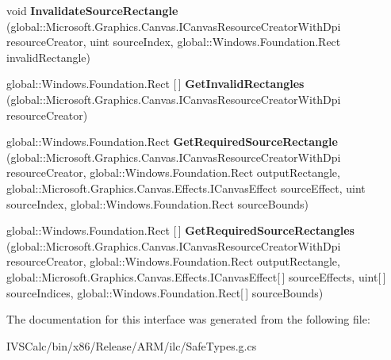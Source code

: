 \begin{DoxyCompactItemize}
void {\bfseries Invalidate\+Source\+Rectangle} (global\+::\+Microsoft.\+Graphics.\+Canvas.\+I\+Canvas\+Resource\+Creator\+With\+Dpi resource\+Creator, uint source\+Index, global\+::\+Windows.\+Foundation.\+Rect invalid\+Rectangle)
\item 
\mbox{\label{interface_microsoft_1_1_graphics_1_1_canvas_1_1_effects_1_1_i_canvas_effect_a0220e194166c3d00d600f6b875b53a99}} 
global\+::\+Windows.\+Foundation.\+Rect \mbox{[}$\,$\mbox{]} {\bfseries Get\+Invalid\+Rectangles} (global\+::\+Microsoft.\+Graphics.\+Canvas.\+I\+Canvas\+Resource\+Creator\+With\+Dpi resource\+Creator)
\item 
\mbox{\label{interface_microsoft_1_1_graphics_1_1_canvas_1_1_effects_1_1_i_canvas_effect_af3c9446ecd22ba8c78ef3a8a382d21c3}} 
global\+::\+Windows.\+Foundation.\+Rect {\bfseries Get\+Required\+Source\+Rectangle} (global\+::\+Microsoft.\+Graphics.\+Canvas.\+I\+Canvas\+Resource\+Creator\+With\+Dpi resource\+Creator, global\+::\+Windows.\+Foundation.\+Rect output\+Rectangle, global\+::\+Microsoft.\+Graphics.\+Canvas.\+Effects.\+I\+Canvas\+Effect source\+Effect, uint source\+Index, global\+::\+Windows.\+Foundation.\+Rect source\+Bounds)
\item 
\mbox{\label{interface_microsoft_1_1_graphics_1_1_canvas_1_1_effects_1_1_i_canvas_effect_a164d8438529055d00d8f6ed3b12c4539}} 
global\+::\+Windows.\+Foundation.\+Rect \mbox{[}$\,$\mbox{]} {\bfseries Get\+Required\+Source\+Rectangles} (global\+::\+Microsoft.\+Graphics.\+Canvas.\+I\+Canvas\+Resource\+Creator\+With\+Dpi resource\+Creator, global\+::\+Windows.\+Foundation.\+Rect output\+Rectangle, global\+::\+Microsoft.\+Graphics.\+Canvas.\+Effects.\+I\+Canvas\+Effect\mbox{[}$\,$\mbox{]} source\+Effects, uint\mbox{[}$\,$\mbox{]} source\+Indices, global\+::\+Windows.\+Foundation.\+Rect\mbox{[}$\,$\mbox{]} source\+Bounds)
\end{DoxyCompactItemize}


The documentation for this interface was generated from the following file\+:\begin{DoxyCompactItemize}
\item 
I\+V\+S\+Calc/bin/x86/\+Release/\+A\+R\+M/ilc/Safe\+Types.\+g.\+cs\end{DoxyCompactItemize}
